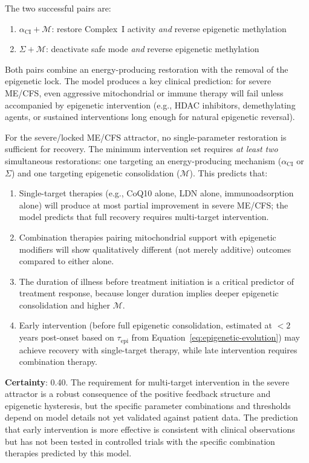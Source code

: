 The two successful pairs are:
\begin{enumerate}
    \item $\alpha_{\text{CI}} + \mathcal{M}$: restore Complex~I activity \emph{and} reverse epigenetic methylation
    \item $\Sigma + \mathcal{M}$: deactivate safe mode \emph{and} reverse epigenetic methylation
\end{enumerate}

Both pairs combine an energy-producing restoration with the removal of the epigenetic lock. The model produces a key clinical prediction: for severe ME/CFS, even aggressive mitochondrial or immune therapy will fail unless accompanied by epigenetic intervention (e.g., HDAC inhibitors, demethylating agents, or sustained interventions long enough for natural epigenetic reversal).

\begin{hypothesis}
\label{hyp:minimum-lock-release}
For the severe/locked ME/CFS attractor, no single-parameter restoration is sufficient for recovery. The minimum intervention set requires \emph{at least two} simultaneous restorations: one targeting an energy-producing mechanism ($\alpha_{\text{CI}}$ or $\Sigma$) and one targeting epigenetic consolidation ($\mathcal{M}$). This predicts that:
\begin{enumerate}
    \item Single-target therapies (e.g., CoQ10 alone, LDN alone, immunoadsorption alone) will produce at most partial improvement in severe ME/CFS; the model predicts that full recovery requires multi-target intervention.
    \item Combination therapies pairing mitochondrial support with epigenetic modifiers will show qualitatively different (not merely additive) outcomes compared to either alone.
    \item The duration of illness before treatment initiation is a critical predictor of treatment response, because longer duration implies deeper epigenetic consolidation and higher $\mathcal{M}$.
    \item Early intervention (before full epigenetic consolidation, estimated at $<2$ years post-onset based on $\tau_{\text{epi}}$ from Equation~\ref{eq:epigenetic-evolution}) may achieve recovery with single-target therapy, while late intervention requires combination therapy.
\end{enumerate}

\textbf{Certainty}: 0.40. The requirement for multi-target intervention in the severe attractor is a robust consequence of the positive feedback structure and epigenetic hysteresis, but the specific parameter combinations and thresholds depend on model details not yet validated against patient data. The prediction that early intervention is more effective is consistent with clinical observations but has not been tested in controlled trials with the specific combination therapies predicted by this model.
\end{hypothesis}


